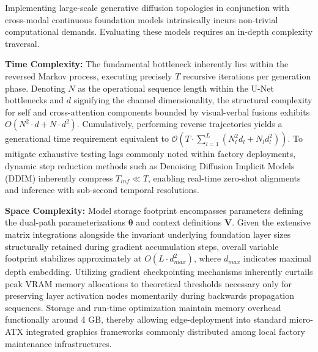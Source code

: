 Implementing large-scale generative diffusion topologies in conjunction with cross-modal continuous foundation models intrinsically incurs non-trivial computational demands. Evaluating these models requires an in-depth complexity traversal.

\textbf{Time Complexity:} The fundamental bottleneck inherently lies within the reversed Markov process, executing precisely $T$ recursive iterations per generation phase. Denoting $N$ as the operational sequence length within the U-Net bottlenecks and $d$ signifying the channel dimensionality, the structural complexity for self and cross-attention components bounded by visual-verbal fusions exhibits $O(N^2 \cdot d + N \cdot d^2)$. Cumulatively, performing reverse trajectories yields a generational time requirement equivalent to $\mathcal{O}(T \cdot \sum_{l=1}^{L} (N_l^2 d_l + N_l d_l^2))$. To mitigate exhaustive testing lags commonly noted within factory deployments, dynamic step reduction methods such as Denoising Diffusion Implicit Models (DDIM) inherently compress $T_{inf} \ll T$, enabling real-time zero-shot alignments and inference with sub-second temporal resolutions.

\textbf{Space Complexity:} Model storage footprint encompasses parameters defining the dual-path parameterizations $\boldsymbol{\theta}$ and context definitions $\mathbf{V}$. Given the extensive matrix integrations alongside the invariant underlying foundation layer sizes structurally retained during gradient accumulation steps, overall variable footprint stabilizes approximately at $O(L \cdot d_{max}^2)$, where $d_{max}$ indicates maximal depth embedding. Utilizing gradient checkpointing mechanisms inherently curtails peak VRAM memory allocations to theoretical thresholds necessary only for preserving layer activation nodes momentarily during backwards propagation sequences. Storage and run-time optimization maintain memory overhead functionally around 4 GB, thereby allowing edge-deployment into standard micro-ATX integrated graphics frameworks commonly distributed among local factory maintenance infrastructures.